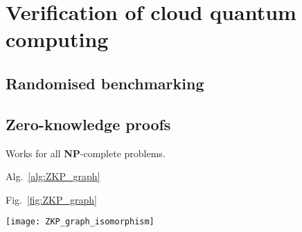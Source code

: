 %
%

\section{Verification of cloud quantum computing} \label{sec:verification}

\subsection{Randomised benchmarking}\label{sec:rand_bench}


\subsection{Zero-knowledge proofs}\label{sec:ZKP}

Works for all \textbf{NP}-complete problems.

Alg.~\ref{alg:ZKP_graph}

Fig.~\ref{fig:ZKP_graph}

\begin{figure*}[!htpb]
	\texttt{[image: ZKP\_graph\_isomorphism]}
\captionspacefig \caption{}\label{fig:ZKP_graph}
\end{figure*}

